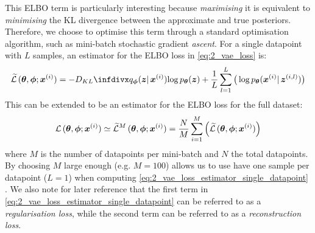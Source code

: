 This ELBO term is particularly interesting because \textit{maximising} it is equivalent to \textit{minimising} the KL divergence between the approximate and true posteriors. Therefore, we choose to optimise this term through a standard optimisation algorithm, such as mini-batch stochastic gradient \textit{ascent}. For a single datapoint with $L$ samples, an estimator for the ELBO loss in \eqref{eq:2_vae_loss} is:
\begin{equation}
    \widetilde{\loss}\,(\boldsymbol{\theta}, \boldsymbol{\phi}; \bx^{(i)}) = 
    -
    \DKL{\qbp(\bz |\, \bx^{(i)})}{\log \pbt(\bz)}
    +   
    \frac{1}{L} \sum^{L}_{l=1} \big(
    \log \pbt (\bx^{(i)} |\, \bz^{(i,l)}) 
    \big)
    \label{eq:2_vae_loss_estimator_single_datapoint}
\end{equation}
This can be extended to be an estimator for the ELBO loss for the full dataset:
\begin{equation}
    \mathcal{L}\,(\boldsymbol{\theta}, \boldsymbol{\phi}; \boldsymbol{x}^{(i)}) 
    \simeq
    \widetilde{\mathcal{L}}^M\,(\boldsymbol{\theta}, \boldsymbol{\phi}; \boldsymbol{x}^{(i)}) 
    =
    \frac{N}{M} \sum^{M}_{i=1} \left(
    \widetilde{\mathcal{L}}\,(\boldsymbol{\theta}, \boldsymbol{\phi}; \boldsymbol{x}^{(i)})
    \right)    \label{eq:2_vae_loss_estimator_dataset}
\end{equation}
where $M$ is the number of datapoints per mini-batch and $N$ the total datapoints. By choosing $M$ large enough (e.g. $M=100$) allows us to use have one sample per datapoint ($L=1$) when computing \eqref{eq:2_vae_loss_estimator_single_datapoint} \cite{variational_bayes}. We also note for later reference that the first term in \eqref{eq:2_vae_loss_estimator_single_datapoint} can be referred to as a \textit{regularisation loss}, while the second term can be referred to as a \textit{reconstruction loss}.

